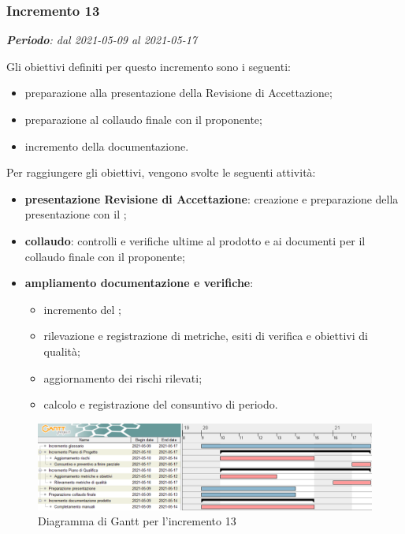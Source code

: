 \subsubsection{Incremento 13}
\textit{\textbf{Periodo}: dal 2021-05-09 al 2021-05-17}

Gli obiettivi definiti per questo incremento sono i seguenti:
\begin{itemize}

\item preparazione alla presentazione della Revisione di Accettazione;
\item preparazione al collaudo finale con il proponente;
\item incremento della documentazione.
\end{itemize}

Per raggiungere gli obiettivi, vengono svolte le seguenti attività:
\begin{itemize}
\item \textbf{presentazione Revisione di Accettazione}: creazione e preparazione della presentazione con il \VT{};
\item \textbf{collaudo}: controlli e verifiche ultime al prodotto e ai documenti per il collaudo finale con il proponente;
\item \textbf{ampliamento documentazione e verifiche}:
\begin{itemize}
\item incremento del ;
\item rilevazione e registrazione di metriche, esiti di verifica e obiettivi di qualità;
\item aggiornamento dei rischi rilevati;
\item calcolo e registrazione del consuntivo di periodo.
\end{itemize}

\end{itemize}
\begin{figure}[H]
\centering

\centerline{\includegraphics[scale=0.6]{res/Pianificazione/Fasi/VerificaIncrementi/ganttIncremento13}}
\caption{Diagramma di Gantt per l'incremento 13}
\end{figure}